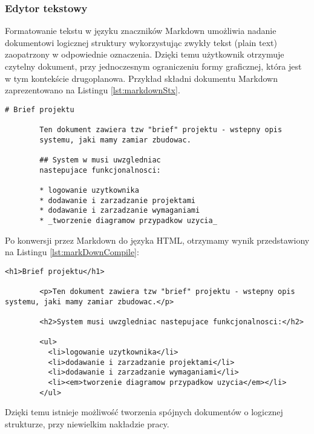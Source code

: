       \subsubsection{Edytor tekstowy}

      Formatowanie tekstu w języku znaczników Markdown \cite{Grub04} umożliwia nadanie dokumentowi logicznej struktury wykorzystując zwykły tekst (plain text) zaopatrzony w odpowiednie oznaczenia. Dzięki temu użytkownik otrzymuje czytelny dokument, przy jednoczesnym ograniczeniu formy graficznej, która jest w tym kontekście drugoplanowa. Przykład składni dokumentu Markdown zaprezentowano na Listingu \ref{lst:markdownStx}.

      \begin{lstlisting}[caption={przykład składni języka Markdown}, label={lst:markdownStx}]
        # Brief projektu

        Ten dokument zawiera tzw "brief" projektu - wstepny opis 
        systemu, jaki mamy zamiar zbudowac.

        ## System w musi uwzgledniac 
        nastepujace funkcjonalnosci:
       
        * logowanie uzytkownika
        * dodawanie i zarzadzanie projektami
        * dodawanie i zarzadzanie wymaganiami
        * _tworzenie diagramow przypadkow uzycia_
      \end{lstlisting}
      
      Po konwersji przez Markdown do języka HTML, otrzymamy wynik przedstawiony na Listingu \ref{lst:markDownCompile}:

      \begin{lstlisting}[caption={wynik konwersji powyższego kodu do HTML}, label={lst:markDownCompile}]
        <h1>Brief projektu</h1>

        <p>Ten dokument zawiera tzw "brief" projektu - wstepny opis systemu, jaki mamy zamiar zbudowac.</p>

        <h2>System musi uwzgledniac nastepujace funkcjonalnosci:</h2>

        <ul>
          <li>logowanie uzytkownika</li>
          <li>dodawanie i zarzadzanie projektami</li>
          <li>dodawanie i zarzadzanie wymaganiami</li>
          <li><em>tworzenie diagramow przypadkow uzycia</em></li>
        </ul>
      \end{lstlisting}
  
      Dzięki temu istnieje możliwość tworzenia spójnych dokumentów o logicznej strukturze, przy niewielkim nakładzie pracy.

